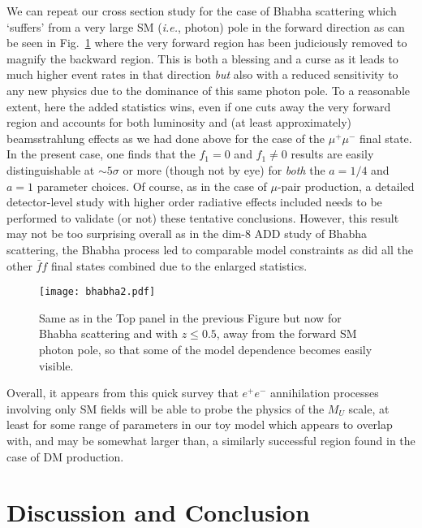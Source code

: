 \documentclass[14pt]{article}
\def\ie{{\it i.e.}}
\begin{document}
{We can repeat our cross section study for the case of Bhabha scattering which `suffers' from a very large SM (\ie, photon) pole in the forward direction as can be seen in Fig.~\ref{fig10} where the very 
forward region has been judiciously removed to magnify the backward region. This is both a blessing and a curse as it leads to much higher event rates in that direction {\it but} also with a reduced 
sensitivity to any new physics due to the dominance of this same photon pole. To a reasonable extent, here the added statistics wins, even if one cuts away the very forward region and accounts for 
both luminosity and (at least approximately) beamsstrahlung effects as we had done above for the case of the $\mu^+\mu^-$ final state. In the present case, one finds that the $f_1=0$ and 
$f_1 \neq 0$ results are easily distinguishable at $\sim 5\sigma$ or more (though not by eye) 
for {\it both} the $a=1/4$ and $a=1$ parameter choices. Of course, as in the case of $\mu$-pair production, a detailed detector-level study with higher order radiative effects included needs to be 
performed to validate (or not) these tentative conclusions. However, this result may not be too surprising overall as in the dim-8 ADD study of Bhabha scattering\cite{Hewett:1998sn,Rizzo:1998fm}, 
the Bhabha process led to comparable model constraints as did all the other $\bar ff$ final states combined due to the enlarged statistics.

%
\begin{figure}[htbp]
\centerline{\texttt{[image: bhabha2.pdf]}}
\vspace*{-1.3cm}
\caption{Same as in the Top panel in the previous Figure but now for Bhabha scattering and with $z\leq 0.5$,  away from the forward SM photon pole, so that some of the model dependence 
becomes easily visible.}
\label{fig10}
\end{figure}
%

Overall, it appears from this quick survey that $e^+e^-$ annihilation processes involving only SM fields will be able to probe the physics of the $M_U$ scale, at least for some range of parameters 
in our toy model which appears to overlap with, and may be somewhat larger than, a similarly successful region found in the case of DM production. 



\section{Discussion and Conclusion}

}
\end{document}
